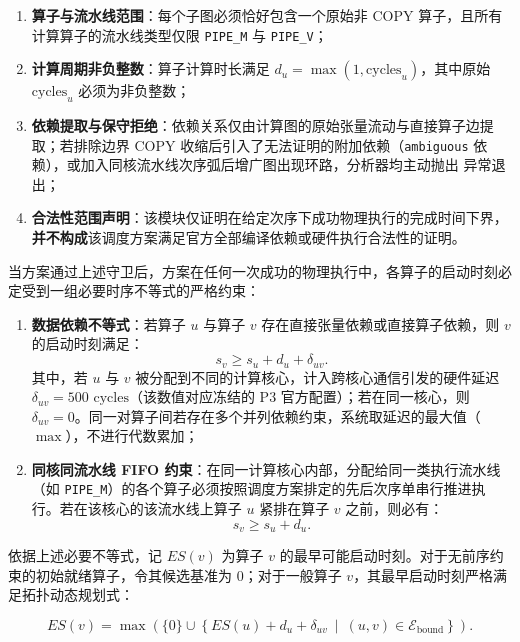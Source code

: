 \documentclass[anonymous,notoc]{gmcm2026}
\providecommand{\tightlist}{\setlength{\itemsep}{0pt}\setlength{\parskip}{0pt}}
\begin{document}
\begin{enumerate}
\def\labelenumi{\arabic{enumi}.}
\tightlist
\item
  \textbf{算子与流水线范围}：每个子图必须恰好包含一个原始非 COPY 算子，且所有计算算子的流水线类型仅限 \texttt{PIPE\_M} 与 \texttt{PIPE\_V}；
\item
  \textbf{计算周期非负整数}：算子计算时长满足 \(d_u = \max(1, \text{cycles}_u)\)，其中原始 \(\text{cycles}_u\) 必须为非负整数；
\item
  \textbf{依赖提取与保守拒绝}：依赖关系仅由计算图的原始张量流动与直接算子边提取；若排除边界 COPY 收缩后引入了无法证明的附加依赖（\texttt{ambiguous} 依赖），或加入同核流水线次序弧后增广图出现环路，分析器均主动抛出 \texttt{} 异常退出；
\item
  \textbf{合法性范围声明}：该模块仅证明在给定次序下成功物理执行的完成时间下界，\textbf{并不构成}该调度方案满足官方全部编译依赖或硬件执行合法性的证明。
\end{enumerate}

当方案通过上述守卫后，方案在任何一次成功的物理执行中，各算子的启动时刻必定受到一组必要时序不等式的严格约束：

\begin{enumerate}
\def\labelenumi{\arabic{enumi}.}
\tightlist
\item
  \textbf{数据依赖不等式}：若算子 \(u\) 与算子 \(v\) 存在直接张量依赖或直接算子依赖，则 \(v\) 的启动时刻满足： \begin{equation}
s_v \ge s_u + d_u + \delta_{uv}.
\end{equation} 其中，若 \(u\) 与 \(v\) 被分配到不同的计算核心，计入跨核心通信引发的硬件延迟 \(\delta_{uv} = 500\text{ cycles}\)（该数值对应冻结的 P3 官方配置）；若在同一核心，则 \(\delta_{uv} = 0\)。同一对算子间若存在多个并列依赖约束，系统取延迟的最大值（\(\max\)），不进行代数累加；
\item
  \textbf{同核同流水线 FIFO 约束}：在同一计算核心内部，分配给同一类执行流水线（如 \texttt{PIPE\_M}）的各个算子必须按照调度方案排定的先后次序单串行推进执行。若在该核心的该流水线上算子 \(u\) 紧排在算子 \(v\) 之前，则必有： \begin{equation}
s_v \ge s_u + d_u.
\end{equation}
\end{enumerate}

依据上述必要不等式，记 \(ES(v)\) 为算子 \(v\) 的最早可能启动时刻。对于无前序约束的初始就绪算子，令其候选基准为 0；对于一般算子 \(v\)，其最早启动时刻严格满足拓扑动态规划式：

\begin{equation}
ES(v) = \max \left( \{0\} \cup \left\{ ES(u) + d_u + \delta_{uv} \ \middle|\ (u, v) \in \mathcal{E}_{\mathrm{bound}} \right\} \right).
\end{equation}
\end{document}
